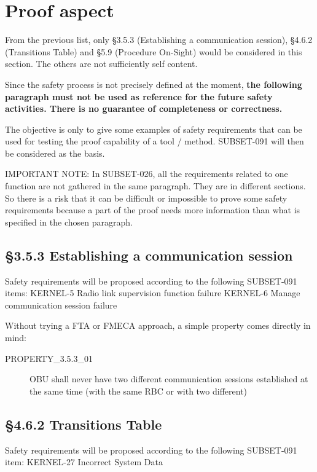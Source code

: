 \documentclass{template/openetcs_report}
\begin{document}
\section{Proof aspect}
From the previous list, only \S3.5.3 (Establishing a communication session), \S4.6.2 (Transitions Table) and \S5.9 (Procedure On-Sight) would be considered in this section. The others are not sufficiently self content.

Since the safety process is not precisely defined at the moment, \textbf{the following paragraph must not be used as reference for the future safety activities. There is no guarantee of completeness or correctness.}

The objective is only to give some examples of safety requirements that can be used for testing the proof capability of a tool / method. SUBSET-091 will then be considered as the basis.

IMPORTANT NOTE: In SUBSET-026, all the requirements related to one function are not gathered in the same paragraph. They are in different sections. So there is a risk that it can be difficult or impossible to prove some safety requirements because a part of the proof needs more information than what is specified in the chosen paragraph.

\subsection{\S3.5.3 Establishing a communication session}
Safety requirements will be proposed according to the following SUBSET-091 items:
\newline KERNEL-5 Radio link supervision function failure
\newline KERNEL-6 Manage communication session failure

Without trying a FTA or FMECA approach, a simple property comes directly in mind: 
\begin{description}
\item [PROPERTY\_3.5.3\_01] OBU shall never have two different communication sessions established at the same time (with the same RBC or with two different)
\end{description}

\subsection{\S4.6.2 Transitions Table}
Safety requirements will be proposed according to the following SUBSET-091 item:
\newline KERNEL-27 Incorrect System Data
\end{document}
